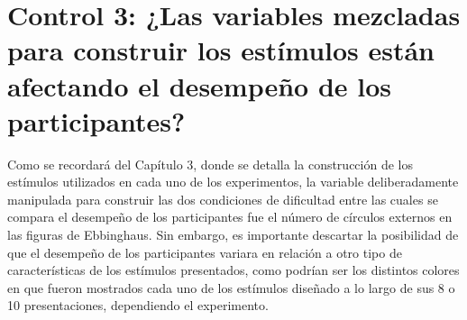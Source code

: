 \section{Control 3: ¿Las variables mezcladas para construir los estímulos están afectando el desempeño de los participantes?}

Como se recordará del Capítulo 3, donde se detalla la construcción de los estímulos utilizados en cada uno de los experimentos, la variable deliberadamente manipulada para construir las dos condiciones de dificultad entre las cuales se compara el desempeño de los participantes fue el número de círculos externos en las figuras de Ebbinghaus. Sin embargo, es importante descartar la posibilidad de que el desempeño de los participantes variara en relación a otro tipo de características de los estímulos presentados, como podrían ser los distintos colores en que fueron mostrados cada uno de los estímulos diseñado a lo largo de sus 8 o 10 presentaciones, dependiendo el experimento.\\

